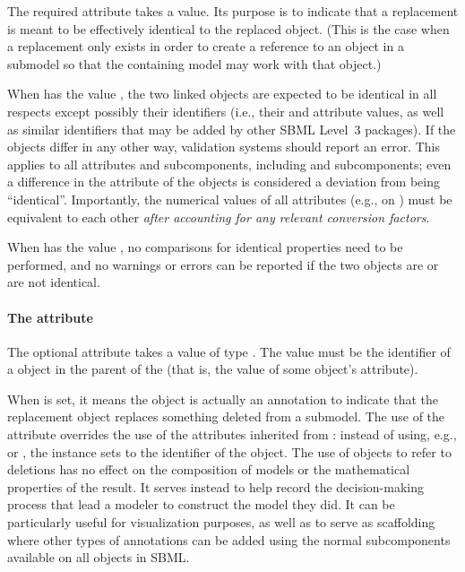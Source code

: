 %

The required attribute  takes a 
value.  Its purpose is to indicate that a replacement is meant to be
effectively identical to the replaced object.  (This is the case when a
replacement only exists in order to create a reference to an object in a
submodel so that the containing model may work with that object.)

When  has the value , the two linked objects
are expected to be identical in all respects except possibly their
identifiers (i.e., their  and  attribute values,
as well as similar identifiers that may be added by other SBML Level~3
packages).  If the objects differ in any other way, validation systems
should report an error.  This applies to all attributes and
subcomponents, including \Annotation and \Notes subcomponents; even a
difference in the  attribute of the objects is considered a
deviation from being ``identical''.  Importantly, the numerical values
of all attributes (e.g.,  on \Species) must be
equivalent to each other \emph{after accounting for any relevant
 conversion factors}.

When  has the value , no comparisons for
identical properties need to be performed, and no warnings or errors can
be reported if the two objects are or are not identical.


\paragraph{The \hspace*{1pt} attribute}
\label{replacedelement-deletion}

The optional attribute  takes a value of type
.  The value must be the identifier of a \Deletion object in
the parent \Model of the \ReplacedElement (that is, the value of some \Deletion object's 
attribute).  

When  is set, it means the \ReplacedElement object is
actually an annotation to indicate that the replacement object replaces
something deleted from a submodel.  The use of the 
attribute overrides the use of the attributes inherited from \SBaseRef:
instead of using, e.g.,  or , the
\ReplacedElement instance sets  to the identifier of the
\Deletion object.  The use of \ReplacedElement objects to refer to
deletions has no effect on the composition of models or the mathematical
properties of the result.  It serves instead to help record the
decision-making process that lead a modeler to construct the model they
did.  It can be particularly useful for visualization purposes, as well
as to serve as scaffolding where other types of annotations can be added
using the normal \Annotation subcomponents available on all \SBase
objects in SBML.

